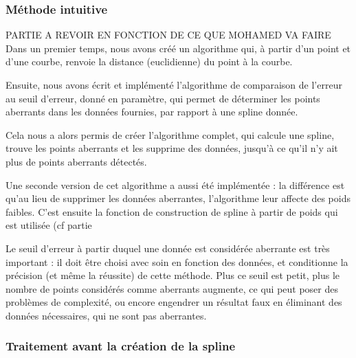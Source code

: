 \documentclass[a4paper,12pt]{article} %
\begin{document}
			\subsubsection{Méthode intuitive}
			
			    PARTIE A REVOIR EN FONCTION DE CE QUE MOHAMED VA FAIRE
                Dans un premier temps, nous avons créé un algorithme qui, à partir d'un point et d'une courbe, renvoie la distance (euclidienne) du point à la courbe.
                
                Ensuite, nous avons écrit et implémenté l'algorithme de comparaison de l'erreur au seuil d'erreur, donné en paramètre, qui permet de déterminer les points aberrants dans les données fournies, par rapport à une spline donnée.
                
                Cela nous a alors permis de créer l'algorithme complet, qui calcule une spline, trouve les points aberrants et les supprime des données, jusqu'à ce qu'il n'y ait plus de points aberrants détectés.
                
                Une seconde version de cet algorithme a aussi été implémentée : la différence est qu'au lieu de supprimer les données aberrantes, l'algorithme leur affecte des poids faibles. C'est ensuite la fonction de construction de spline à partir de poids qui est utilisée (cf partie
                
                Le seuil d'erreur à partir duquel une donnée est considérée aberrante est très important : il doit être choisi avec soin en fonction des données, et conditionne la précision (et même la réussite) de cette méthode. Plus ce seuil est petit, plus le nombre de points considérés comme aberrants augmente, ce qui peut poser des problèmes de complexité, ou encore engendrer un résultat faux en éliminant des données nécessaires, qui ne sont pas aberrantes.
			
			\subsubsection{Traitement avant la création de la spline}
			
\end{document}
